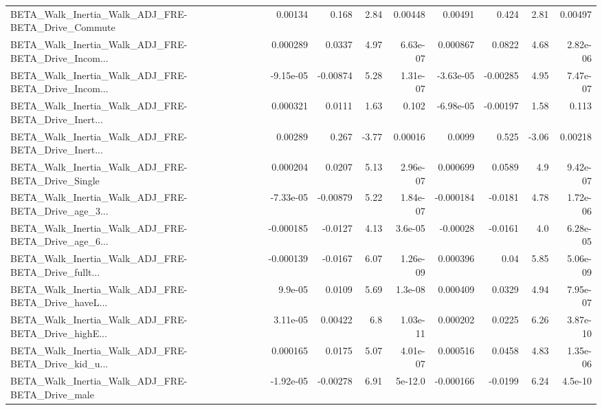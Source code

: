 \begin{tabular}{lrrrrrrrr}
BETA\_Walk\_Inertia\_Walk\_ADJ\_FRE-BETA\_Drive\_Commute  &     0.00134 &        0.168 &     2.84 &  0.00448 &    0.00491 &       0.424 &         2.81 &       0.00497 \\
BETA\_Walk\_Inertia\_Walk\_ADJ\_FRE-BETA\_Drive\_Incom... &    0.000289 &       0.0337 &     4.97 & 6.63e-07 &   0.000867 &      0.0822 &         4.68 &      2.82e-06 \\
BETA\_Walk\_Inertia\_Walk\_ADJ\_FRE-BETA\_Drive\_Incom... &   -9.15e-05 &     -0.00874 &     5.28 & 1.31e-07 &  -3.63e-05 &    -0.00285 &         4.95 &      7.47e-07 \\
BETA\_Walk\_Inertia\_Walk\_ADJ\_FRE-BETA\_Drive\_Inert... &    0.000321 &       0.0111 &     1.63 &    0.102 &  -6.98e-05 &    -0.00197 &         1.58 &         0.113 \\
BETA\_Walk\_Inertia\_Walk\_ADJ\_FRE-BETA\_Drive\_Inert... &     0.00289 &        0.267 &    -3.77 &  0.00016 &     0.0099 &       0.525 &        -3.06 &       0.00218 \\
BETA\_Walk\_Inertia\_Walk\_ADJ\_FRE-BETA\_Drive\_Single   &    0.000204 &       0.0207 &     5.13 & 2.96e-07 &   0.000699 &      0.0589 &          4.9 &      9.42e-07 \\
BETA\_Walk\_Inertia\_Walk\_ADJ\_FRE-BETA\_Drive\_age\_3... &   -7.33e-05 &     -0.00879 &     5.22 & 1.84e-07 &  -0.000184 &     -0.0181 &         4.78 &      1.72e-06 \\
BETA\_Walk\_Inertia\_Walk\_ADJ\_FRE-BETA\_Drive\_age\_6... &   -0.000185 &      -0.0127 &     4.13 &  3.6e-05 &   -0.00028 &     -0.0161 &          4.0 &      6.28e-05 \\
BETA\_Walk\_Inertia\_Walk\_ADJ\_FRE-BETA\_Drive\_fullt... &   -0.000139 &      -0.0167 &     6.07 & 1.26e-09 &   0.000396 &        0.04 &         5.85 &      5.06e-09 \\
BETA\_Walk\_Inertia\_Walk\_ADJ\_FRE-BETA\_Drive\_haveL... &     9.9e-05 &       0.0109 &     5.69 &  1.3e-08 &   0.000409 &      0.0329 &         4.94 &      7.95e-07 \\
BETA\_Walk\_Inertia\_Walk\_ADJ\_FRE-BETA\_Drive\_highE... &    3.11e-05 &      0.00422 &      6.8 & 1.03e-11 &   0.000202 &      0.0225 &         6.26 &      3.87e-10 \\
BETA\_Walk\_Inertia\_Walk\_ADJ\_FRE-BETA\_Drive\_kid\_u... &    0.000165 &       0.0175 &     5.07 & 4.01e-07 &   0.000516 &      0.0458 &         4.83 &      1.35e-06 \\
BETA\_Walk\_Inertia\_Walk\_ADJ\_FRE-BETA\_Drive\_male     &   -1.92e-05 &     -0.00278 &     6.91 &  5e-12.0 &  -0.000166 &     -0.0199 &         6.24 &       4.5e-10 \\

\end{tabular}
